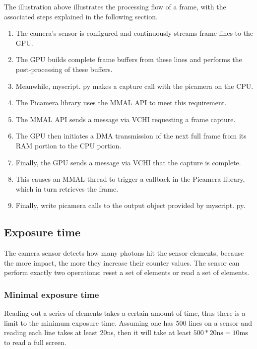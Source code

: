 \documentclass[12pt, a4paper]{report}
\begin{document}
    
    
    \bigskip
    
    The illustration above illustrates the processing flow of a frame, with the associated steps explained in the following section.
    
    \begin{enumerate}
    \item The camera's sensor is configured and continuously streams frame lines to the GPU.
    \item The GPU builds complete frame buffers from these lines and performs the post-processing of these buffers.
    \item Meanwhile, myscript. py makes a capture call with the picamera on the CPU.
    \item The Picamera library uses the MMAL API to meet this requirement.
    \item The MMAL API sends a message via VCHI requesting a frame capture.
    \item The GPU then initiates a DMA transmission of the next full frame from its RAM portion to the CPU portion.
    \item Finally, the GPU sends a message via VCHI that the capture is complete.
    \item This causes an MMAL thread to trigger a callback in the Picamera library, which in turn retrieves the frame.
    \item Finally, write picamera calls to the output object provided by myscript. py.
    \end{enumerate}
    
    \subsection{Exposure time}
    
    The camera sensor detects how many photons hit the sensor elements, because the more impact, the more they increase their counter values. The sensor can perform exactly two operations; reset a set of elements or read a set of elements.
    
    \subsubsection{Minimal exposure time}
    
    Reading out a series of elements takes a certain amount of time, thus there is a limit to the minimum exposure time. Assuming one has 500 lines on a sensor and reading each line takes at least 20ns, then it will take at least $500*20 \text{ns} = 10 \text{ms}$ to read a full screen. 
    
\end{document}

